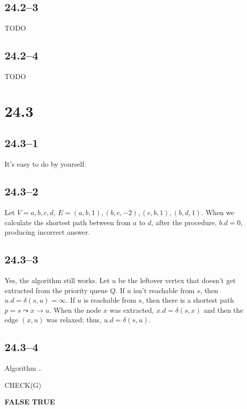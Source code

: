 \documentclass{article}
\begin{document}
\subsection*{24.2--3}
TODO

\subsection*{24.2--4}
TODO

\section*{24.3}
\subsection*{24.3--1}
It's easy to do by yourself.

\subsection*{24.3--2}
Let $V = {a, b, c, d}$, $E = {(a, b, 1), (b, c, -2), (c, b, 1), (b, d, 1)}$.
When we calculate the shortest path between from $a$ to $d$, after the
procedure, $b.d = 0$, producing incorrect answer.

\subsection*{24.3--3}
Yes, the algorithm still works. Let $u$ be the leftover vertex that doesn't
get extracted from the priority queue $Q$. If $u$ isn't reachable from $s$,
then $u.d = \delta(s, u) = \infty$. If $u$ is reachable from $s$, then there is a shortest path \mbox{$p = s\leadsto x \rightarrow u$}. When the node $x$ was extracted, $x.d = \delta(s, x)$ and then the edge $(x, u)$ was relaxed; thus,
$u.d = \delta(s, u)$.

\subsection*{24.3--4}
Algorithm ..\\
\begin{algorithm}
  \caption{\label{alg1} CHECK(G)}
  \begin{algorithmic}
    \RETURN \textbf{FALSE}
    \ENDIF
    \ENDFOR
    \ENDFOR
    \RETURN \textbf{TRUE}
  \end{algorithmic}
\end{algorithm}
\end{document}
